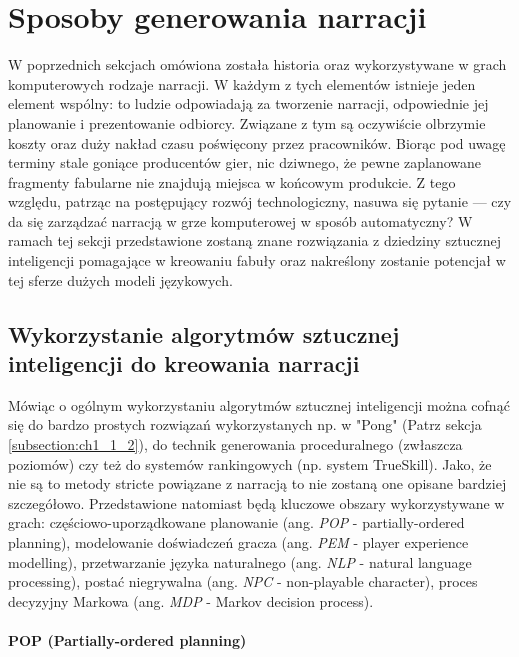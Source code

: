 \graphicspath{{chapters/chapter4/imgs/}}

\chapter{Sposoby generowania narracji}\label{chapter:ch4}

W poprzednich sekcjach omówiona została historia oraz wykorzystywane w grach komputerowych rodzaje
narracji. W każdym z tych elementów istnieje jeden element wspólny: to ludzie odpowiadają za tworzenie
narracji, odpowiednie jej planowanie i prezentowanie odbiorcy. Związane z tym są oczywiście olbrzymie
koszty oraz duży nakład czasu poświęcony przez pracowników. Biorąc pod uwagę terminy stale goniące
producentów gier, nic dziwnego, że pewne zaplanowane fragmenty fabularne nie znajdują miejsca w końcowym
produkcie. Z tego względu, patrząc na postępujący rozwój technologiczny, nasuwa się pytanie ---
czy da się zarządzać narracją w grze komputerowej w sposób automatyczny? W ramach tej sekcji
przedstawione zostaną znane rozwiązania z dziedziny sztucznej inteligencji pomagające w kreowaniu fabuły
oraz nakreślony zostanie potencjał w tej sferze dużych modeli językowych.

\section{Wykorzystanie algorytmów sztucznej inteligencji do kreowania narracji}\label{section:ch4_1}

Mówiąc o ogólnym wykorzystaniu algorytmów sztucznej inteligencji można cofnąć się do bardzo prostych
rozwiązań wykorzystanych np. w "Pong" (Patrz sekcja \ref{subsection:ch1_1_2}), do technik generowania
proceduralnego (zwłaszcza poziomów) czy też do systemów rankingowych (np. system TrueSkill). Jako, że
nie są to metody stricte powiązane z narracją to nie zostaną one opisane bardziej szczegółowo.
Przedstawione natomiast będą kluczowe obszary wykorzystywane w grach: częściowo-uporządkowane planowanie
(ang. \textit{POP} - partially-ordered planning), modelowanie doświadczeń gracza (ang. \textit{PEM} -
player experience modelling), przetwarzanie języka naturalnego (ang. \textit{NLP} - natural language
processing), postać niegrywalna (ang. \textit{NPC} - non-playable character), proces decyzyjny Markowa
(ang. \textit{MDP} - Markov decision process).

\subsubsection*{POP (Partially-ordered planning)}

